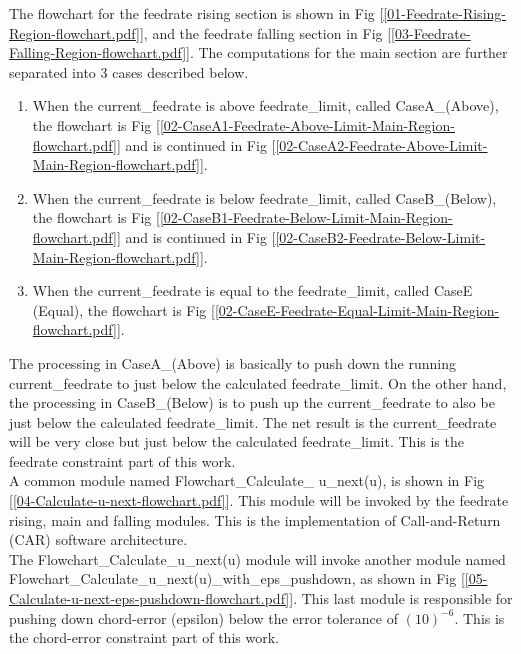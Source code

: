 The flowchart for the feedrate rising section is shown in  Fig [\ref{01-Feedrate-Rising-Region-flowchart.pdf}], and the feedrate falling section in Fig [\ref{03-Feedrate-Falling-Region-flowchart.pdf}]. The computations for the main section are further separated into 3 cases described below. 

\begin{enumerate}
	
\item When the current\_feedrate is above feedrate\_limit, called CaseA\_(Above), the flowchart is Fig [\ref{02-CaseA1-Feedrate-Above-Limit-Main-Region-flowchart.pdf}] and is continued in Fig [\ref{02-CaseA2-Feedrate-Above-Limit-Main-Region-flowchart.pdf}].

\item When the current\_feedrate is below feedrate\_limit, called CaseB\_(Below), the flowchart is Fig [\ref{02-CaseB1-Feedrate-Below-Limit-Main-Region-flowchart.pdf}] and is continued in Fig [\ref{02-CaseB2-Feedrate-Below-Limit-Main-Region-flowchart.pdf}].
 
\item When the current\_feedrate is equal to the feedrate\_limit, called CaseE (Equal), the flowchart is Fig [\ref{02-CaseE-Feedrate-Equal-Limit-Main-Region-flowchart.pdf}].

\end{enumerate}

The processing in CaseA\_(Above) is basically to push down the running current\_feedrate to just below the calculated feedrate\_limit. On the other hand, the processing in CaseB\_(Below) is to push up the current\_feedrate to also be just below the calculated feedrate\_limit. The net result is the current\_feedrate will be very close but just below the calculated feedrate\_limit.
This is the feedrate constraint part of this work. \\

A common module named Flowchart\_Calculate\_ u\_next(u), is shown in Fig [\ref{04-Calculate-u-next-flowchart.pdf}]. This module will be invoked by the feedrate rising, main and falling modules. This is the implementation of Call-and-Return (CAR) software architecture. \\


The Flowchart\_Calculate\_u\_next(u) module will invoke another module named Flowchart\_Calculate\_u\_next(u)\_with\_eps\_pushdown, as shown in Fig [\ref{05-Calculate-u-next-eps-pushdown-flowchart.pdf}]. This last module is responsible for pushing down chord-error (epsilon) below the error tolerance of $(10)^{-6}$. This is the chord-error constraint part of this work.\\
 
